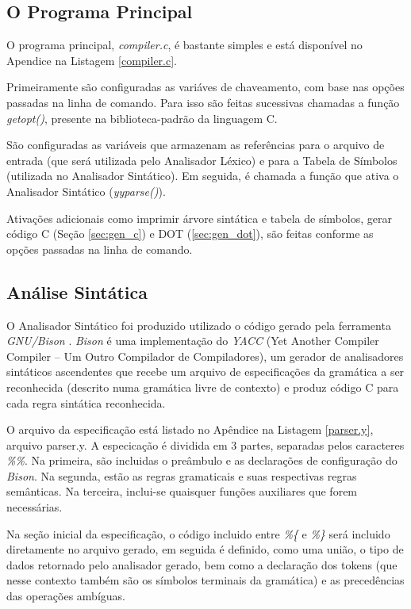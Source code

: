 \subsection{O Programa Principal}
O programa principal, \emph{compiler.c}, é bastante simples e está disponível
no Apendice na Listagem \ref{compiler.c}.

Primeiramente são configuradas as variáves de chaveamento, com base nas opções
passadas na linha de comando. Para isso são feitas sucessivas chamadas a
função \emph{getopt()}, presente na biblioteca-padrão da linguagem C.

São configuradas as variáveis que armazenam as referências para o arquivo de
entrada (que será utilizada pelo Analisador Léxico) e para a Tabela de
Símbolos (utilizada no Analisador Sintático). Em seguida, é chamada a função
que ativa o Analisador Sintático (\emph{yyparse()}).

Ativações adicionais como imprimir árvore sintática e tabela de símbolos,
gerar código C (Seção \ref{sec:gen_c}) e DOT (\ref{sec:gen_dot}), são feitas
conforme as opções passadas na linha de comando.


\subsection{Análise Sintática}
O Analisador Sintático foi produzido utilizado o código gerado pela ferramenta
\emph{GNU/Bison} \cite{bison}. \emph{Bison} é uma implementação do \emph{YACC}
(Yet Another Compiler Compiler {--} Um Outro Compilador de Compiladores), um
gerador de analisadores sintáticos ascendentes que recebe um arquivo de
especificações da gramática a ser reconhecida (descrito numa gramática livre
de contexto) e produz código C para cada regra sintática reconhecida.

O arquivo da especificação está listado no Apêndice na Listagem
\ref{parser.y}, arquivo parser.y. A especicação é dividida em 3 partes,
separadas pelos caracteres \emph{\%\%}. Na primeira, são incluidas o preâmbulo
e as declarações de configuração do \emph{Bison}. Na segunda, estão as regras
gramaticais e suas respectivas regras semânticas. Na terceira, inclui-se
quaisquer funções auxiliares que forem necessárias.

Na seção inicial da especificação, o código incluido entre \emph{\%\{} e
\emph{\%\}} será incluido diretamente no arquivo gerado, em seguida é
definido, como uma união, o tipo de dados retornado pelo analisador gerado,
bem como a declaração dos tokens (que nesse contexto também são os símbolos
terminais da gramática) e as precedências das operações ambíguas.

